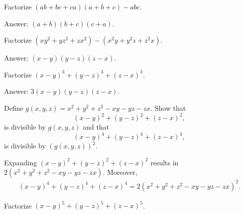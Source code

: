 \documentclass[12pt,a4paper]{memoir}
\theoremstyle{definition}
\begin{document}
\begin{tcolorbox}
	\begin{question}
		Factorize $(ab+bc+ca)(a+b+c)-abc$.
	\end{question}
\end{tcolorbox}

\begin{solution}[name=Solution by Parviz Shahriari]
	Answer: $(a+b)(b+c)(c+a)$.
\end{solution}


\begin{tcolorbox}
	\begin{question}
		Factorize $(xy^2+yz^2+zx^2)-(x^2y+y^2z+z^2x)$.
	\end{question}
\end{tcolorbox}

\begin{solution}
	Answer: $(x-y)(y-z)(z-x)$.
\end{solution}

\begin{tcolorbox}
	\begin{question}
		Factorize $(x-y)^3+(y-z)^3+(z-x)^3$.
	\end{question}
\end{tcolorbox}

\begin{solution}
	Answer: $3(x-y)(y-z)(z-x)$.
\end{solution}


\begin{tcolorbox}
	\begin{question}
		Define $g(x,y,z)=x^2+y^2+z^2-xy-yz-zx$. Show that \[(x-y)^2+(y-z)^2+(z-x)^2,\] is divisible by $g(x,y,z)$ and that \[(x-y)^4+(y-z)^4+(z-x)^4,\] is divisible by $\left(g(x,y,z)\right)^2$.
	\end{question}
\end{tcolorbox}

\begin{solution}
	Expanding $(x-y)^2+(y-z)^2+(z-x)^2$ results in $2(x^2+y^2+z^2-xy-yz-zx)$. Moreover,
	\begin{align*}
		(x-y)^4+(y-z)^4+(z-x)^4 = 2(x^2+y^2+z^2-xy-yz-zx)^2.
	\end{align*}
\end{solution}




\begin{tcolorbox}
	\begin{question}
		Factorize $(x-y)^5 + (y-z)^5 + (z-x)^5$.
	\end{question}
\end{tcolorbox}
\end{document}
